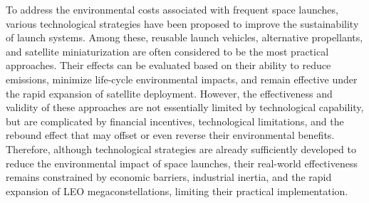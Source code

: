 \documentclass[12pt]{article}
\begin{document}
To address the environmental costs associated with frequent space launches, various technological strategies have been proposed to improve the sustainability of launch systems. Among these, reusable launch vehicles, alternative propellants, and satellite miniaturization are often considered to be the most practical approaches. Their effects can be evaluated based on their ability to reduce emissions, minimize life-cycle environmental impacts, and remain effective under the rapid expansion of satellite deployment. However, the effectiveness and validity of these approaches are not essentially limited by technological capability, but are complicated by financial incentives, technological limitations, and the rebound effect that may offset or even reverse their environmental benefits. Therefore, although technological strategies are already sufficiently developed to reduce the environmental impact of space launches, their real-world effectiveness remains constrained by economic barriers, industrial inertia, and the rapid expansion of LEO megaconstellations, limiting their practical implementation.
\end{document}
